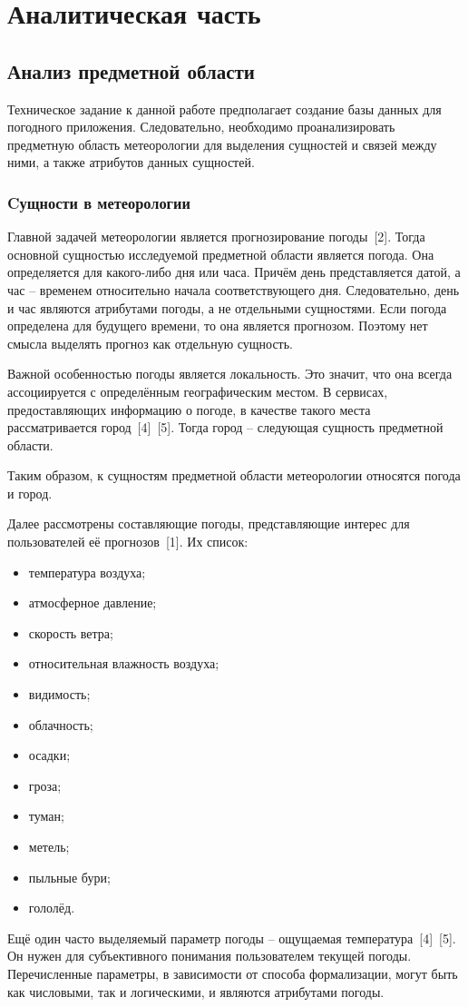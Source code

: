 \chapter{Аналитическая часть}

\section{Анализ предметной области}

Техническое задание к данной работе предполагает создание базы данных для погодного приложения.
Следовательно, необходимо проанализировать предметную область метеорологии для выделения сущностей и связей между ними, а также атрибутов данных сущностей.

\subsection{Cущности в метеорологии}
Главной задачей метеорологии является прогнозирование погоды~[2].
Тогда основной сущностью исследуемой предметной области является погода.
Она определяется для какого-либо дня или часа.
Причём день представляется датой, а час -- временем относительно начала соответствующего дня.
Следовательно, день и час являются атрибутами погоды, а не отдельными сущностями.
Если погода определена для будущего времени, то она является прогнозом.
Поэтому нет смысла выделять прогноз как отдельную сущность.

Важной особенностью погоды является локальность.
Это значит, что она всегда ассоциируется с определённым географическим местом.
В сервисах, предоставляющих информацию о погоде, в качестве такого места рассматривается город~[4]~[5].
Тогда город -- следующая сущность предметной области.

Таким образом, к сущностям предметной области метеорологии относятся погода и город.

Далее рассмотрены составляющие погоды, представляющие интерес для пользователей её прогнозов~[1]. 
Их список:
\begin{itemize}
    \item температура воздуха;
    \item атмосферное давление;
    \item скорость ветра;
    \item относительная влажность воздуха;
    \item видимость;
    \item облачность;
    \item осадки;
    \item гроза;
    \item туман;
    \item метель;
    \item пыльные бури;
    \item гололёд.
\end{itemize}
Ещё один часто выделяемый параметр погоды -- ощущаемая температура~[4]~[5].
Он нужен для субъективного понимания пользователем текущей погоды.
Перечисленные параметры, в зависимости от способа формализации, могут быть как числовыми, так и логическими, и являются атрибутами погоды.

